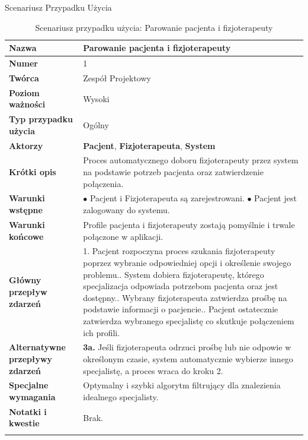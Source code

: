 \documentclass{beamer}
\begin{document}
\begin{frame}{Scenariusz Przypadku Użycia}
    \tiny %
    \begin{longtable}{|p{}|p{}|}
    	\hline
    	\textbf{Nazwa} & \textbf{Parowanie pacjenta i fizjoterapeuty} \\ \hline
    	\textbf{Numer} & 1 \\ \hline
    	\textbf{Twórca} & Zespół Projektowy \\ \hline
    	\textbf{Poziom ważności} & Wysoki \\ \hline
    	\textbf{Typ przypadku użycia} & Ogólny \\ \hline
    	\textbf{Aktorzy} & \textbf{Pacjent}, \textbf{Fizjoterapeuta}, \textbf{System} \\ \hline
    	\textbf{Krótki opis} & Proces automatycznego doboru fizjoterapeuty przez system na podstawie potrzeb pacjenta oraz zatwierdzenie połączenia. \\ \hline
    	\textbf{Warunki wstępne} & 
    	$\bullet$ Pacjent i Fizjoterapeuta są zarejestrowani.\newline
    	$\bullet$ Pacjent jest zalogowany do systemu.
    	\\ \hline
    	\textbf{Warunki końcowe} & Profile pacjenta i fizjoterapeuty zostają pomyślnie i trwale połączone w aplikacji. \\ \hline
    	\textbf{Główny przepływ zdarzeń} & 
    	1. Pacjent rozpoczyna proces szukania fizjoterapeuty poprzez wybranie odpowiedniej opcji i określenie swojego problemu.\newline
    	2. System dobiera fizjoterapeutę, którego specjalizacja odpowiada potrzebom pacjenta oraz jest dostępny.\newline
    	3. Wybrany fizjoterapeuta zatwierdza prośbę na podstawie informacji o pacjencie.\newline
    	4. Pacjent ostatecznie zatwierdza wybranego specjalistę co skutkuje połączeniem ich profili.
    	\\ \hline
    	\textbf{Alternatywne przepływy zdarzeń} & 
    	\textbf{3a.} Jeśli fizjoterapeuta odrzuci prośbę lub nie odpowie w określonym czasie, system automatycznie wybierze innego specjalistę, a proces wraca do kroku 2. \\ \hline
    	\textbf{Specjalne wymagania} & Optymalny i szybki algorytm filtrujący dla znalezienia idealnego specjalisty. \\ \hline
    	\textbf{Notatki i kwestie} & Brak. \\ \hline
    	\caption{Scenariusz przypadku użycia: Parowanie pacjenta i fizjoterapeuty}
    \end{longtable}
\end{frame}
\end{document}
